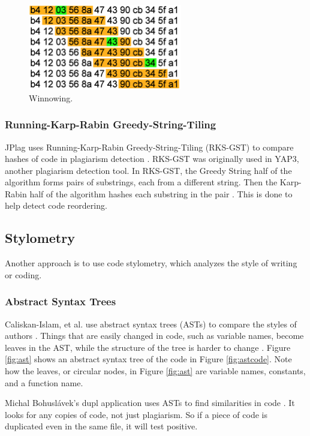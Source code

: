 \documentclass[12pt]{article}
\begin{document}
				\begin{figure}[h!]
					\includegraphics[width=0.6\textwidth]{Winnowing.png}
					\caption{Winnowing.}
					\label{fig:winnowing1}
				\end{figure}
			
			\subsubsection{Running-Karp-Rabin Greedy-String-Tiling}
				JPlag uses Running-Karp-Rabin Greedy-String-Tiling (RKS-GST) to compare hashes of code in plagiarism detection \cite{prechelt+malpohl+philippsen}. RKS-GST was originally used in YAP3, another plagiarism detection tool. In RKS-GST, the Greedy String half of the algorithm forms pairs of substrings, each from a different string. Then the Karp-Rabin half of the algorithm hashes each substring in the pair \cite{wise}. This is done to help detect code reordering.
		
		\subsection{Stylometry}
			Another approach is to use code stylometry, which analyzes the style of writing or coding.
			
			\subsubsection{Abstract Syntax Trees}
				Caliskan-Islam, et al. use abstract syntax trees (ASTs) to compare the styles of authors \cite{caliskan-islam+harang+liu}. Things that are easily changed in code, such as variable names, become leaves in the AST, while the structure of the tree is harder to change \cite{caliskan-islam+harang+liu}. Figure \ref{fig:ast} shows an abstract syntax tree of the code in Figure \ref{fig:astcode}. Note how the leaves, or circular nodes, in Figure \ref{fig:ast} are variable names, constants, and a function name.
				
				Michal Bohuslávek's dupl application uses ASTs to find similarities in code \cite{bohuslave}. It looks for any copies of code, not just plagiarism. So if a piece of code is duplicated even in the same file, it will test positive.
			
\end{document}
